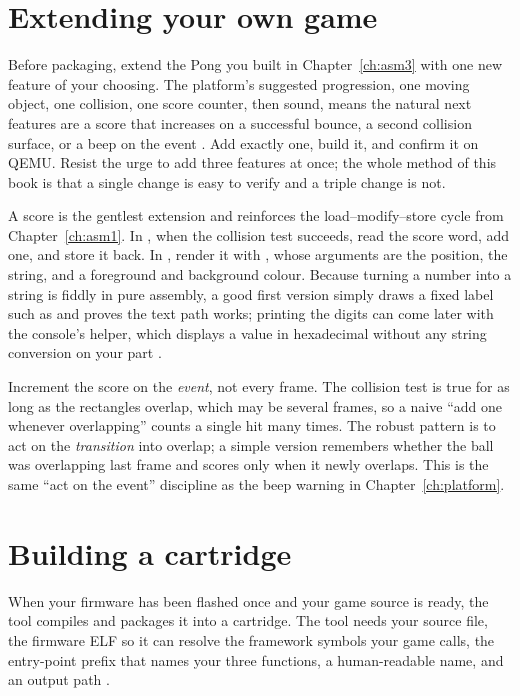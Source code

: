 \section{Extending your own game}

Before packaging, extend the Pong you built in Chapter~\ref{ch:asm3} with one new
feature of your choosing. The platform's suggested progression, one moving
object, one collision, one score counter, then sound, means the natural next
features are a score that increases on a successful bounce, a second collision
surface, or a beep on the event \citep{prg32tutorial}. Add exactly one, build it,
and confirm it on QEMU. Resist the urge to add three features at once; the whole
method of this book is that a single change is easy to verify and a triple change
is not.

A score is the gentlest extension and reinforces the load--modify--store cycle
from Chapter~\ref{ch:asm1}. In , when the collision test succeeds,
read the score word, add one, and store it back. In , render it with
, whose arguments are the position, the string, and a
foreground and background colour. Because turning a number into a string is
fiddly in pure assembly, a good first version simply draws a fixed label such as
 and proves the text path works; printing the digits can come later
with the console's  helper, which displays a value in
hexadecimal without any string conversion on your part \citep{prg32repo}.

\begin{prgwarn}
Increment the score on the \emph{event}, not every frame. The collision test is
true for as long as the rectangles overlap, which may be several frames, so a
naive ``add one whenever overlapping'' counts a single hit many times. The robust
pattern is to act on the \emph{transition} into overlap; a simple version remembers
whether the ball was overlapping last frame and scores only when it newly
overlaps. This is the same ``act on the event'' discipline as the beep warning in
Chapter~\ref{ch:platform}.
\end{prgwarn}

\section{Building a cartridge}

When your firmware has been flashed once and your game source is ready, the
 tool compiles and packages it into a 
cartridge. The tool needs your source file, the firmware ELF so it can resolve
the framework symbols your game calls, the entry-point prefix that names your
three functions, a human-readable name, and an output path \citep{prg32tutorial}.

